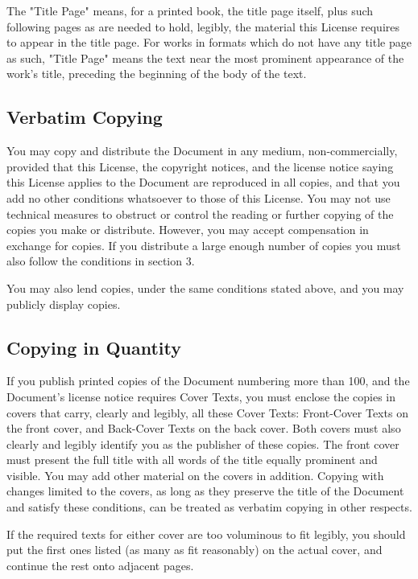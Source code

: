 	The "Title Page" means, for a printed book, the title page itself, plus such following pages as are needed to hold, legibly, the material this License requires to appear in the title page. For works in formats which do not have any title page as such, "Title Page" means the text near the most prominent appearance of the work's title, preceding the beginning of the body of the text. 

	\subsection{Verbatim Copying} 
	You may copy and distribute the Document in any medium, non-commercially, provided that this License, the copyright notices, and the license notice saying this License applies to the Document are reproduced in all copies, and that you add no other conditions whatsoever to those of this License. You may not use technical measures to obstruct or control the reading or further copying of the copies you make or distribute. However, you may accept compensation in exchange for copies. If you distribute a large enough number of copies you must also follow the conditions in section 3. 

	You may also lend copies, under the same conditions stated above, and you may publicly display copies. 

	\subsection{Copying in Quantity}

	If you publish printed copies of the Document numbering more than 100, and the Document's license notice requires Cover Texts, you must enclose the copies in covers that carry, clearly and legibly, all these Cover Texts: Front-Cover Texts on the front cover, and Back-Cover Texts on the back cover. Both covers must also clearly and legibly identify you as the publisher of these copies. The front cover must present the full title with all words of the title equally prominent and visible. You may add other material on the covers in addition. Copying with changes limited to the covers, as long as they preserve the title of the Document and satisfy these conditions, can be treated as verbatim copying in other respects. 

	If the required texts for either cover are too voluminous to fit legibly, you should put the first ones listed (as many as fit reasonably) on the actual cover, and continue the rest onto adjacent pages. 

